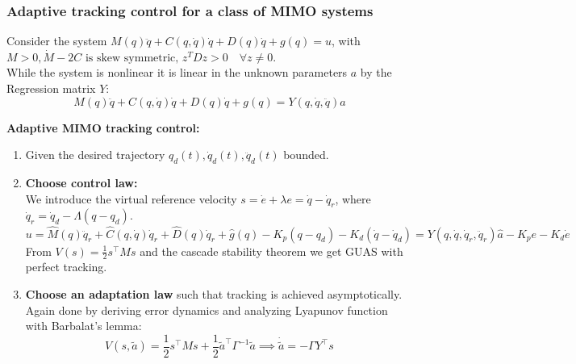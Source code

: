 \subsubsection{Adaptive tracking control for a class of MIMO systems}
Consider the system $M(q) \ddot{q}+C(q, \dot{q}) \dot{q}+D(q) \dot{q}+g(q)=u$, with $M>0, \dot{M}-2 C \text { is skew symmetric, } z^{T} D z>0 \quad \forall z \neq 0$.\\
While the system is nonlinear it is linear in the unknown parameters $a$ by the Regression matrix $Y$:
\begin{equation}
    M(q) \ddot{q}+C(q, \dot{q}) \dot{q}+D(q) \dot{q}+g(q)=Y(q, \dot{q}, \ddot{q}) a
\end{equation} 

\begin{tcolorbox}[colback=white, colframe=teal]
    \textbf{Adaptive MIMO tracking control:}
    \begin{enumerate}
        \item Given the desired trajectory $q_d(t), \dot{q}_d(t), \ddot{q}_d(t)$ bounded.
        \item \textbf{Choose control law:}\\
        We introduce the virtual reference velocity $s= \dot{e} + \lambda e = \dot{q} - \dot{q}_r$, where $\dot{q}_{r}=\dot{q}_{d}
        -\Lambda\left(q-q_{d}\right)$.\\
        \begin{equation}
            u=\hat{M}(q) \ddot{q}_{r}+\hat{C}(q, \dot{q}) \dot{q}_{r}+\hat{D}(q) \dot{q}_{r}+\hat{g}(q)-K_{p}\left(q-q_{d}\right)-K_{d}\left(\dot{q}-\dot{q}_{d}\right) = Y\left(q, \dot{q}, \dot{q}_{r}, \ddot{q}_{r}\right) \hat{a}-K_{p} e-K_{d} \dot{e}
        \end{equation}
        From $V(s)= \frac{1}{2} s^{\top}Ms$ and the cascade stability theorem we get GUAS with perfect tracking.
        \item \textbf{Choose an adaptation law} such that tracking is achieved asymptotically. Again done by deriving error dynamics and analyzing Lyapunov function with Barbalat's lemma:
        \begin{equation}
            V(s, \tilde{a}) = \frac{1}{2} s^{\top}Ms + \frac{1}{2} \tilde{a}^{\top}\Gamma^{-1}\tilde{a} \implies \dot{\tilde{a}} = - \Gamma Y^{\top}s
        \end{equation}
        
    \end{enumerate}
\end{tcolorbox}

